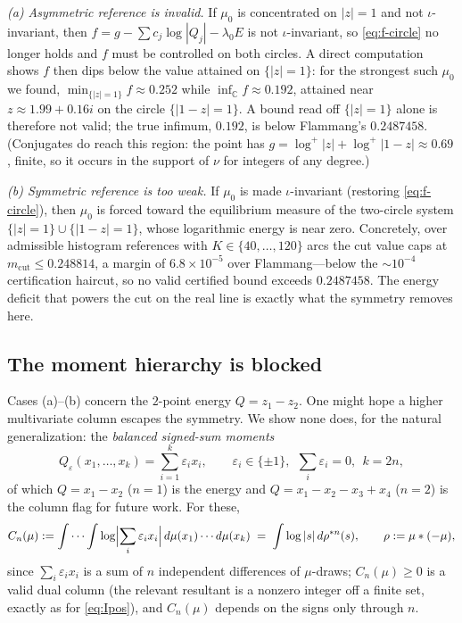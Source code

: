 \documentclass[11pt,reqno]{amsart}
\theoremstyle{plain}
\theoremstyle{definition}
\newcommand{\C}{\mathbb{C}}
\begin{document}
\emph{(a) Asymmetric reference is invalid.} If $\mu_0$ is concentrated on $|z|=1$ and
not $\iota$-invariant, then $f=g-\sum c_j\log|Q_j|-\lambda_0E$ is not
$\iota$-invariant, so \eqref{eq:f-circle} no longer holds and $f$ must be controlled on
both circles. A direct computation shows $f$ then dips below the value attained on
$\{|z|=1\}$: for the strongest such $\mu_0$ we found, $\min_{\{|z|=1\}}f\approx0.252$
while $\inf_{\C}f\approx0.192$, attained near $z\approx1.99+0.16i$ on the circle
$\{|1-z|=1\}$. A bound read off $\{|z|=1\}$ alone is therefore not valid; the true
infimum, $0.192$, is below Flammang's $0.2487458$. (Conjugates do reach this region:
the point has $g=\log^+|z|+\log^+|1-z|\approx0.69$, finite, so it occurs in the support
of $\nu$ for integers of any degree.)

\emph{(b) Symmetric reference is too weak.} If $\mu_0$ is made $\iota$-invariant
(restoring \eqref{eq:f-circle}), then $\mu_0$ is forced toward the equilibrium measure
of the two-circle system $\{|z|=1\}\cup\{|1-z|=1\}$, whose logarithmic energy is near
zero. Concretely, over admissible histogram references with $K\in\{40,\dots,120\}$
arcs the cut value caps at $m_{\mathrm{cut}}\le0.248814$, a margin of
$6.8\times10^{-5}$ over Flammang---below the $\sim10^{-4}$ certification haircut, so no
valid certified bound exceeds $0.2487458$. The energy deficit that powers the cut on
the real line is exactly what the symmetry removes here.

\subsection{The moment hierarchy is blocked}

Cases (a)--(b) concern the $2$-point energy $Q=z_1-z_2$. One might hope a higher
multivariate column escapes the symmetry. We show none does, for the natural
generalization: the \emph{balanced signed-sum moments}
\begin{equation}\label{eq:Qs}
  Q_\varepsilon(x_1,\dots,x_k)=\sum_{i=1}^k\varepsilon_ix_i,\qquad
  \varepsilon_i\in\{\pm1\},\ \ \sum_i\varepsilon_i=0,\ \ k=2n,
\end{equation}
of which $Q=x_1-x_2$ ($n=1$) is the energy and $Q=x_1-x_2-x_3+x_4$ ($n=2$) is the
column \citet{OSS} flag for future work. For these,
\begin{equation}\label{eq:Cn}
  C_n(\mu):=\idotsint\log\Bigl|\sum_i\varepsilon_ix_i\Bigr|\,d\mu(x_1)\cdots d\mu(x_k)
  \;=\;\int\log|s|\,d\rho^{*n}(s),\qquad \rho:=\mu*(-\mu),
\end{equation}
since $\sum_i\varepsilon_ix_i$ is a sum of $n$ independent differences of $\mu$-draws;
$C_n(\mu)\ge0$ is a valid dual column (the relevant resultant is a nonzero integer off
a finite set, exactly as for \eqref{eq:Ipos}), and $C_n(\mu)$ depends on the signs only
through $n$.
\end{document}
